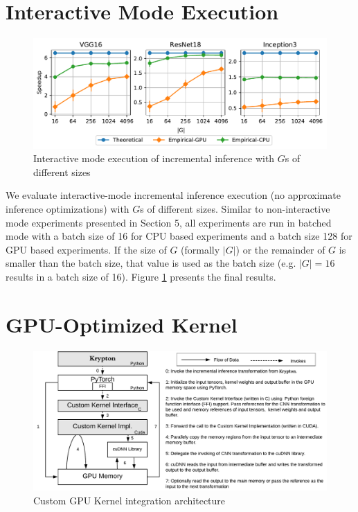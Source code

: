 \appendix

\section{Interactive Mode Execution}

\begin{figure}[t]
\includegraphics[width=\columnwidth]{images/interactive_experiment.pdf}
\vspace{-8mm}
\caption{Interactive mode execution of incremental inference with $G$s of different sizes}
\label{fig:interactive_experiment}
\end{figure}

We evaluate interactive-mode incremental inference execution (no approximate inference optimizations) with $G$s of different sizes.
Similar to non-interactive mode experiments presented in Section 5, all experiments are run in batched mode with a batch size of 16 for CPU based experiments and a batch size 128 for GPU based experiments.
If the size of $G$ (formally $|G|$) or the remainder of $G$ is smaller than the batch size, that value is used as the batch size (e.g. $|G| = 16$ results in a batch size of 16).
Figure \ref{fig:interactive_experiment} presents the final results.

\section{GPU-Optimized Kernel}

\begin{figure}[t]
\includegraphics[width=\columnwidth]{images/gpu_kernel_impl.pdf}
\vspace{-6mm}
\caption{Custom GPU Kernel integration architecture}
\label{fig:custom_kernel_integration}
\end{figure}

